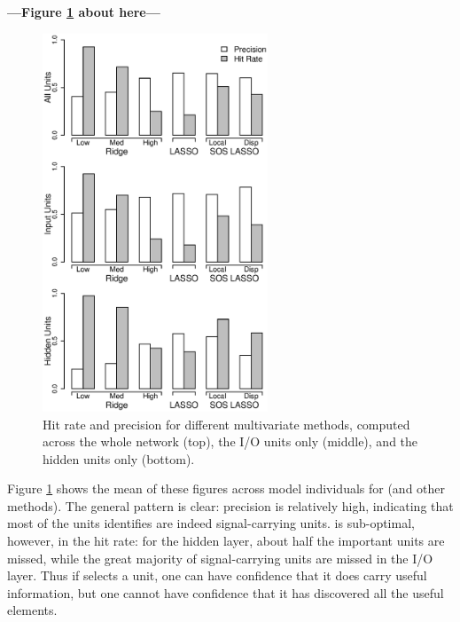 \begin{center}
\textbf{---Figure \ref{fig.precision} about here---}
\end{center}

\begin{figure}
\centering
\includegraphics[width=0.6\textwidth]{figures/figure7.eps}
\caption{\label{fig.precision} Hit rate and precision for different multivariate methods, computed across the whole network (top), the I/O units only (middle), and the hidden units only (bottom).}
\end{figure}

Figure \ref{fig.precision} shows the mean of these figures across model individuals for {\lasso} (and other methods). The general pattern is clear: precision is relatively high, indicating that most of the units {\lasso} identifies are indeed signal-carrying units. {\lasso} is sub-optimal, however, in the hit rate: for the hidden layer, about half the important units are missed, while the great majority of signal-carrying units are missed in the I/O layer. Thus if {\lasso} selects a unit, one can have confidence that it does carry useful information, but one cannot have confidence that it has discovered all the useful elements.

